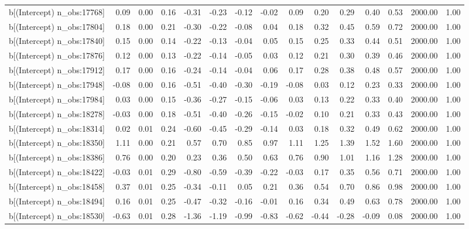 \begin{table}[ht]
\begin{tabular}{rrrrrrrrrrrrrrr}
  b[(Intercept) n\_obs:17768] & 0.09 & 0.00 & 0.16 & -0.31 & -0.23 & -0.12 & -0.02 & 0.09 & 0.20 & 0.29 & 0.40 & 0.53 & 2000.00 & 1.00 \\ 
  b[(Intercept) n\_obs:17804] & 0.18 & 0.00 & 0.21 & -0.30 & -0.22 & -0.08 & 0.04 & 0.18 & 0.32 & 0.45 & 0.59 & 0.72 & 2000.00 & 1.00 \\ 
  b[(Intercept) n\_obs:17840] & 0.15 & 0.00 & 0.14 & -0.22 & -0.13 & -0.04 & 0.05 & 0.15 & 0.25 & 0.33 & 0.44 & 0.51 & 2000.00 & 1.00 \\ 
  b[(Intercept) n\_obs:17876] & 0.12 & 0.00 & 0.13 & -0.22 & -0.14 & -0.05 & 0.03 & 0.12 & 0.21 & 0.30 & 0.39 & 0.46 & 2000.00 & 1.00 \\ 
  b[(Intercept) n\_obs:17912] & 0.17 & 0.00 & 0.16 & -0.24 & -0.14 & -0.04 & 0.06 & 0.17 & 0.28 & 0.38 & 0.48 & 0.57 & 2000.00 & 1.00 \\ 
  b[(Intercept) n\_obs:17948] & -0.08 & 0.00 & 0.16 & -0.51 & -0.40 & -0.30 & -0.19 & -0.08 & 0.03 & 0.12 & 0.23 & 0.33 & 2000.00 & 1.00 \\ 
  b[(Intercept) n\_obs:17984] & 0.03 & 0.00 & 0.15 & -0.36 & -0.27 & -0.15 & -0.06 & 0.03 & 0.13 & 0.22 & 0.33 & 0.40 & 2000.00 & 1.00 \\ 
  b[(Intercept) n\_obs:18278] & -0.03 & 0.00 & 0.18 & -0.51 & -0.40 & -0.26 & -0.15 & -0.02 & 0.10 & 0.21 & 0.33 & 0.43 & 2000.00 & 1.00 \\ 
  b[(Intercept) n\_obs:18314] & 0.02 & 0.01 & 0.24 & -0.60 & -0.45 & -0.29 & -0.14 & 0.03 & 0.18 & 0.32 & 0.49 & 0.62 & 2000.00 & 1.00 \\ 
  b[(Intercept) n\_obs:18350] & 1.11 & 0.00 & 0.21 & 0.57 & 0.70 & 0.85 & 0.97 & 1.11 & 1.25 & 1.39 & 1.52 & 1.60 & 2000.00 & 1.00 \\ 
  b[(Intercept) n\_obs:18386] & 0.76 & 0.00 & 0.20 & 0.23 & 0.36 & 0.50 & 0.63 & 0.76 & 0.90 & 1.01 & 1.16 & 1.28 & 2000.00 & 1.00 \\ 
  b[(Intercept) n\_obs:18422] & -0.03 & 0.01 & 0.29 & -0.80 & -0.59 & -0.39 & -0.22 & -0.03 & 0.17 & 0.35 & 0.56 & 0.71 & 2000.00 & 1.00 \\ 
  b[(Intercept) n\_obs:18458] & 0.37 & 0.01 & 0.25 & -0.34 & -0.11 & 0.05 & 0.21 & 0.36 & 0.54 & 0.70 & 0.86 & 0.98 & 2000.00 & 1.00 \\ 
  b[(Intercept) n\_obs:18494] & 0.16 & 0.01 & 0.25 & -0.47 & -0.32 & -0.16 & -0.01 & 0.16 & 0.34 & 0.49 & 0.63 & 0.78 & 2000.00 & 1.00 \\ 
  b[(Intercept) n\_obs:18530] & -0.63 & 0.01 & 0.28 & -1.36 & -1.19 & -0.99 & -0.83 & -0.62 & -0.44 & -0.28 & -0.09 & 0.08 & 2000.00 & 1.00 \\ 

\end{tabular}
\end{table}
